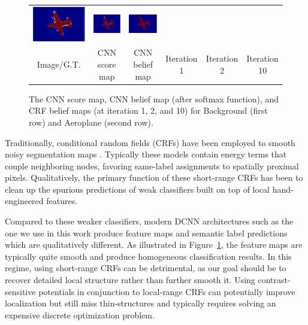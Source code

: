 \begin{figure}[ht]
\begin{tabular}{c c c c c c}
    \includegraphics[width=0.13\linewidth]{fig/mean_field_illustration/Belief_Class1_Itr1.pdf} & 
    \includegraphics[width=0.13\linewidth]{fig/mean_field_illustration/Belief_Class1_Itr2.pdf} & 
    \includegraphics[width=0.13\linewidth]{fig/mean_field_illustration/Belief_Class1_Itr10.pdf} \\
    Image/G.T. & CNN score map & CNN belief map & Iteration 1 & Iteration 2 & Iteration 10 \\
  \end{tabular}
  \caption{The CNN score map, CNN belief map (after softmax function), and CRF belief maps (at iteration 1, 2, and 10) for Background (first row) and Aeroplane (second row).
    }
  \label{fig:score-maps}
\end{figure}

Traditionally, conditional random fields (CRFs) have been employed to smooth
noisy segmentation maps \cite{rother2004grabcut, kohli2009robust}. Typically
these models contain energy terms that couple neighboring nodes, favoring
same-label assignments to spatially proximal pixels. Qualitatively, the
primary function of these short-range CRFs has been to clean up the spurious
predictions of weak classifiers built on top of local hand-engineered features.

Compared to these weaker classifiers, modern DCNN architectures such as
the one we use in this work produce feature maps and semantic label
predictions which are qualitatively different. As illustrated in
Figure~\ref{fig:score-maps}, the feature maps are typically quite smooth and
produce homogeneous classification results. In this regime, using short-range
CRFs can be detrimental, as our goal should be to recover detailed local
structure rather than further smooth it. Using contrast-sensitive potentials
\cite{rother2004grabcut} in conjunction to local-range CRFs can potentially
improve localization but still miss thin-structures and typically requires
solving an expensive discrete optimization problem.


